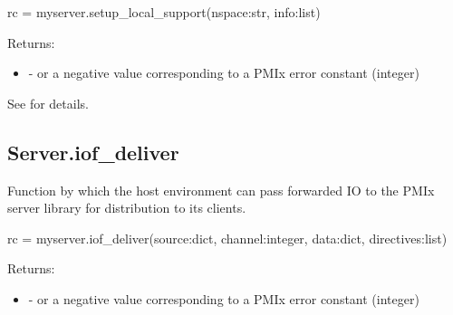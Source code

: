 \format

\pyspecificstart
\begin{codepar}
rc = myserver.setup_local_support(nspace:str, info:list)
\end{codepar}
\pyspecificend


\begin{arglist}
\end{arglist}

Returns:

\begin{itemize}
    \item {} -  or a negative value corresponding to a PMIx error constant (integer)
\end{itemize}

See  for details.


\subsection{Server.iof_deliver}

\summary
Function by which the host environment can pass forwarded \ac{IO} to the \ac{PMIx} server library for distribution to its clients.

\format

\pyspecificstart
\begin{codepar}
rc = myserver.iof_deliver(source:dict, channel:integer,
                          data:dict, directives:list)
\end{codepar}
\pyspecificend


\begin{arglist}
\end{arglist}

Returns:

\begin{itemize}
    \item {} -  or a negative value corresponding to a PMIx error constant (integer)
\end{itemize}


